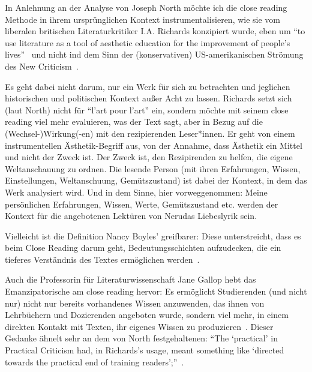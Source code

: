 In Anlehnung an der Analyse von Joseph North möchte ich die close reading Methode in ihrem ursprünglichen Kontext instrumentalisieren, wie sie vom liberalen britischen Literaturkritiker I.A. Richards konzipiert wurde, eben um ``to use literature as a tool of aesthetic education for the improvement of people's lives''~\cite{North2013}
und nicht ind dem Sinn der (konservativen) US-amerikanischen Strömung des New Criticism~\cite{North2013}.

Es geht dabei nicht darum, nur ein Werk für sich zu betrachten und jeglichen historischen und politischen Kontext außer Acht zu lassen.
Richards setzt sich (laut North) nicht für ``l'art pour l'art'' ein, sondern möchte mit seinem close reading viel mehr evaluieren, was der Text sagt, aber in Bezug auf die (Wechsel-)Wirkung(-en) mit den rezipierenden Leser*innen.
Er geht von einem instrumentellen Ästhetik-Begriff aus, von der Annahme, dass Ästhetik ein Mittel und nicht der Zweck ist.
Der Zweck ist, den Rezipirenden zu helfen, die eigene Weltanschauung zu ordnen.
Die lesende Person (mit ihren Erfahrungen, Wissen, Einstellungen, Weltanschuung, Gemütszustand) ist dabei der Kontext, in dem das Werk analysiert wird.
Und in dem Sinne, hier vorweggenommen:
Meine persönlichen Erfahrungen, Wissen, Werte, Gemütszustand etc. werden der Kontext für die angebotenen Lektüren von Nerudas Liebeslyrik sein.

Vielleicht ist die Definition Nancy Boyles' greifbarer: 
Diese unterstreicht, dass es beim Close Reading darum geht, Bedeutungsschichten aufzudecken, die ein tieferes Verständnis des Textes ermöglichen werden~\cite[90]{Boyles2016}.

Auch die Professorin für Literaturwissenschaft Jane Gallop hebt das Emanzipatorische am close reading hervor:
Es ermöglicht Studierenden (und nicht nur) nicht nur bereits vorhandenes Wissen anzuwenden, das ihnen von Lehrbüchern und Dozierenden angeboten wurde, sondern viel mehr, in einem direkten Kontakt mit Texten, ihr eigenes Wissen zu produzieren~\cite{Gallop2007}.
Dieser Gedanke ähnelt sehr an dem von North festgehaltenen: ``The `practical' in Practical Criticism had, in Richards’s usage, meant something like `directed towards the practical end of training readers';''~\cite{North2013}.


